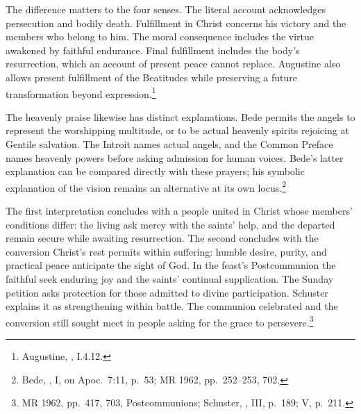 The difference matters to the four senses. The literal
account acknowledges persecution and bodily death.
Fulfillment in Christ concerns his victory and the members
who belong to him. The moral consequence includes the
virtue awakened by faithful endurance. Final fulfillment
includes the body's resurrection, which an account of
present peace cannot replace. Augustine also allows
present fulfillment of the Beatitudes while preserving
a future transformation beyond expression.\footnote{Augustine,
, I.4.12.}

The heavenly praise likewise has distinct explanations.
Bede permits the angels to represent the worshipping
multitude, or to be actual heavenly spirits rejoicing
at Gentile salvation. The Introit names actual angels,
and the Common Preface names heavenly powers before
asking admission for human voices. Bede's latter
explanation can be compared directly with these prayers;
his symbolic explanation of the vision remains an
alternative at its own locus.\footnote{Bede,
, I, on Apoc.~7:11, p.~53;
MR 1962, pp.~252--253, 702.}

The first interpretation concludes with a people united
in Christ whose members' conditions differ: the living
ask mercy with the saints' help, and the departed
remain secure while awaiting resurrection. The second
concludes with the conversion Christ's rest permits
within suffering: humble desire, purity, and practical
peace anticipate the sight of God. In the feast's
Postcommunion the faithful seek enduring joy and the
saints' continual supplication. The Sunday petition
asks protection for those admitted to divine
participation. Schuster explains it as strengthening
within battle. The communion celebrated and the
conversion still sought meet in people asking for
the grace to persevere.\footnote{MR 1962, pp.~417, 703,
Postcommunions; Schuster, , III,
p.~189; V, p.~211.}
